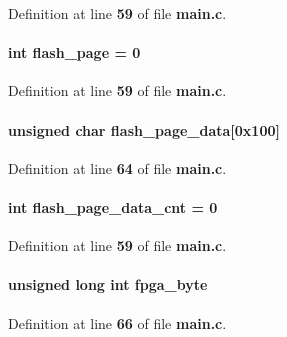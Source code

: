 Definition at line {\bf 59} of file {\bf main.\+c}.

\paragraph[{flash\+\_\+page}]{\setlength{\rightskip}{0pt plus 5cm}int flash\+\_\+page = 0}\label{main_8c_a94c92d0dbd9b5bc2eb94b54000c493a7}


Definition at line {\bf 59} of file {\bf main.\+c}.

\paragraph[{flash\+\_\+page\+\_\+data}]{\setlength{\rightskip}{0pt plus 5cm}unsigned char flash\+\_\+page\+\_\+data[0x100]}\label{main_8c_a422c160683776056d99052dcfb13205e}


Definition at line {\bf 64} of file {\bf main.\+c}.

\paragraph[{flash\+\_\+page\+\_\+data\+\_\+cnt}]{\setlength{\rightskip}{0pt plus 5cm}int flash\+\_\+page\+\_\+data\+\_\+cnt = 0}\label{main_8c_a523ed049511d3ec1df08896a758a5cc8}


Definition at line {\bf 59} of file {\bf main.\+c}.

\paragraph[{fpga\+\_\+byte}]{\setlength{\rightskip}{0pt plus 5cm}unsigned long int fpga\+\_\+byte}\label{main_8c_a9a91db67ced00c1c2e6e76035e134ed5}


Definition at line {\bf 66} of file {\bf main.\+c}.

